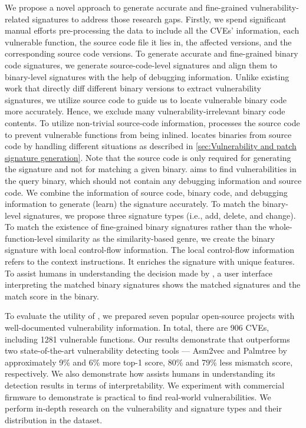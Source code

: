 We propose a novel approach to generate accurate and fine-grained vulnerability-related signatures to address those research gaps. 
Firstly, we spend significant manual efforts pre-processing the data to include all the CVEs' information, each vulnerable function, the source code file it lies in, the affected versions, and the corresponding source code versions. 
To generate accurate and fine-grained binary code signatures, we generate source-code-level signatures and align them to binary-level signatures with the help of debugging information. 
Unlike existing work \cite{vmpbl,viva, binxray} that directly diff different binary versions to extract vulnerability signatures, we utilize source code to guide us to locate vulnerable binary code more accurately. 
Hence, we exclude many vulnerability-irrelevant binary code contents. 
To utilize non-trivial source-code information, \name processes the source code to prevent vulnerable functions from being inlined.
\name locates binaries from source code by handling different situations as described in \autoref{sec:Vulnerability and patch signature generation}. 
Note that the source code is only required for generating the signature and not for matching a given binary.
\name aims to find vulnerabilities in the query binary, which should not contain any debugging information and source code. 
We combine the information of source code, binary code, and debugging information to generate (learn) the signature accurately.
To match the binary-level signatures, we propose three signature types (i.e., add, delete, and change). 
To match the existence of fine-grained binary signatures rather than the whole-function-level similarity as the similarity-based genre, we create the binary signature with local control-flow information. 
The local control-flow information refers to the context instructions. It enriches the signature with unique features.  
To assist humans in understanding the decision made by \name, a user interface interpreting the matched binary signatures shows the matched signatures and the match score in the binary.



To evaluate the utility of \name, we prepared seven popular open-source projects with well-documented vulnerability information. 
In total, there are 906 CVEs, including 1281 vulnerable functions.
Our results demonstrate that \name outperforms two state-of-the-art vulnerability detecting tools --- Asm2vec and Palmtree by approximately 9\% and 6\% more top-1 score, 80\% and 79\% less mismatch score, respectively.
We also demonstrate how \name assists humans in understanding its detection results in terms of interpretability. We experiment with commercial firmware to demonstrate \name is practical to find real-world vulnerabilities.
We perform in-depth research on the vulnerability and signature types and their distribution in the dataset.

